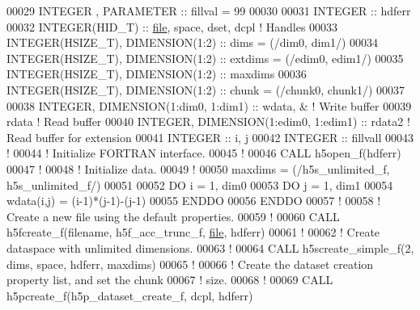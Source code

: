 \begin{DoxyCode}
00029   \textcolor{keywordtype}{INTEGER}          , \textcolor{keywordtype}{PARAMETER} :: fillval  = 99
00030 
00031   \textcolor{keywordtype}{INTEGER} :: hdferr
00032   \textcolor{keywordtype}{INTEGER(HID\_T)}  :: \hyperlink{structfile}{file}, space, dset, dcpl \textcolor{comment}{! Handles}
00033   \textcolor{keywordtype}{INTEGER(HSIZE\_T)}, \textcolor{keywordtype}{DIMENSION(1:2)} :: dims    = (/dim0, dim1/)
00034   \textcolor{keywordtype}{INTEGER(HSIZE\_T)}, \textcolor{keywordtype}{DIMENSION(1:2)} :: extdims = (/edim0, edim1/)
00035   \textcolor{keywordtype}{INTEGER(HSIZE\_T)}, \textcolor{keywordtype}{DIMENSION(1:2)} :: maxdims
00036   \textcolor{keywordtype}{INTEGER(HSIZE\_T)}, \textcolor{keywordtype}{DIMENSION(1:2)} :: chunk   = (/chunk0, chunk1/)
00037 
00038   \textcolor{keywordtype}{INTEGER}, \textcolor{keywordtype}{DIMENSION(1:dim0, 1:dim1)}   :: wdata, & \textcolor{comment}{! Write buffer }
00039                                           rdata    \textcolor{comment}{! Read buffer}
00040   \textcolor{keywordtype}{INTEGER}, \textcolor{keywordtype}{DIMENSION(1:edim0, 1:edim1)} :: rdata2   \textcolor{comment}{! Read buffer for extension}
00041   \textcolor{keywordtype}{INTEGER} :: i, j
00042   \textcolor{keywordtype}{INTEGER} :: fillvall
00043   \textcolor{comment}{!}
00044   \textcolor{comment}{! Initialize FORTRAN interface.}
00045   \textcolor{comment}{!}
00046   \textcolor{keyword}{CALL }h5open\_f(hdferr)
00047   \textcolor{comment}{!}
00048   \textcolor{comment}{! Initialize data.}
00049   \textcolor{comment}{!}
00050   maxdims = (/h5s\_unlimited\_f, h5s\_unlimited\_f/)
00051 
00052   \textcolor{keywordflow}{DO} i = 1, dim0
00053      \textcolor{keywordflow}{DO} j = 1, dim1
00054         wdata(i,j) = (i-1)*(j-1)-(j-1)
00055 \textcolor{keywordflow}{     ENDDO}
00056 \textcolor{keywordflow}{  ENDDO}
00057   \textcolor{comment}{!}
00058   \textcolor{comment}{! Create a new file using the default properties.}
00059   \textcolor{comment}{!}
00060   \textcolor{keyword}{CALL }h5fcreate\_f(filename, h5f\_acc\_trunc\_f, \hyperlink{structfile}{file}, hdferr)
00061   \textcolor{comment}{!}
00062   \textcolor{comment}{! Create dataspace with unlimited dimensions.}
00063   \textcolor{comment}{!}
00064   \textcolor{keyword}{CALL }h5screate\_simple\_f(2, dims, space, hdferr, maxdims)
00065   \textcolor{comment}{!  }
00066   \textcolor{comment}{! Create the dataset creation property list, and set the chunk}
00067   \textcolor{comment}{! size.}
00068   \textcolor{comment}{!}
00069   \textcolor{keyword}{CALL }h5pcreate\_f(h5p\_dataset\_create\_f, dcpl, hdferr)

\end{DoxyCode}
